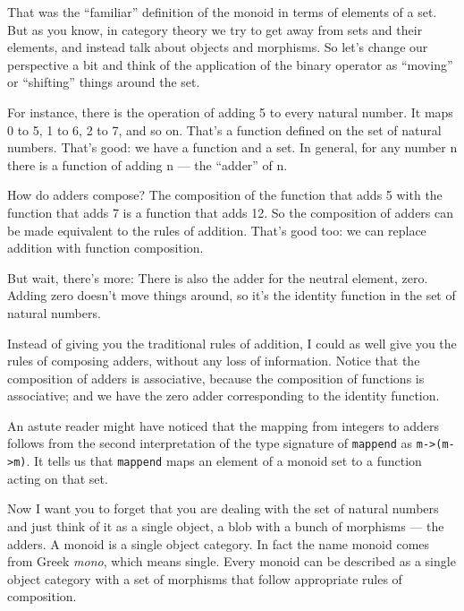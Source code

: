 That was the ``familiar'' definition of the monoid in terms of elements
of a set. But as you know, in category theory we try to get away from
sets and their elements, and instead talk about objects and morphisms.
So let's change our perspective a bit and think of the application of
the binary operator as ``moving'' or ``shifting'' things around the set.

For instance, there is the operation of adding 5 to every natural
number. It maps 0 to 5, 1 to 6, 2 to 7, and so on. That's a function
defined on the set of natural numbers. That's good: we have a function
and a set. In general, for any number n there is a function of adding n
--- the ``adder'' of n.

How do adders compose? The composition of the function that adds 5 with
the function that adds 7 is a function that adds 12. So the composition
of adders can be made equivalent to the rules of addition. That's good
too: we can replace addition with function composition.

But wait, there's more: There is also the adder for the neutral element,
zero. Adding zero doesn't move things around, so it's the identity
function in the set of natural numbers.

Instead of giving you the traditional rules of addition, I could as well
give you the rules of composing adders, without any loss of information.
Notice that the composition of adders is associative, because the
composition of functions is associative; and we have the zero adder
corresponding to the identity function.

An astute reader might have noticed that the mapping from integers to
adders follows from the second interpretation of the type signature of
\texttt{mappend} as \texttt{m->(m->m)}. It
tells us that \texttt{mappend} maps an element of a monoid set to a
function acting on that set.

Now I want you to forget that you are dealing with the set of natural
numbers and just think of it as a single object, a blob with a bunch of
morphisms --- the adders. A monoid is a single object category. In fact
the name monoid comes from Greek \emph{mono}, which means single. Every
monoid can be described as a single object category with a set of
morphisms that follow appropriate rules of composition.


\begin{figure}
  \centering
\end{figure}

